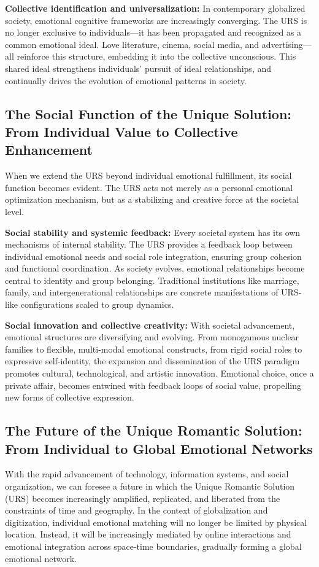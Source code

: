 \documentclass[12pt]{article}
\begin{document}
\textbf{Collective identification and universalization:} In contemporary globalized society, emotional cognitive frameworks are increasingly converging. The URS is no longer exclusive to individuals—it has been propagated and recognized as a common emotional ideal. Love literature, cinema, social media, and advertising—all reinforce this structure, embedding it into the collective unconscious. This shared ideal strengthens individuals’ pursuit of ideal relationships, and continually drives the evolution of emotional patterns in society.
\subsection{The Social Function of the Unique Solution: From Individual Value to Collective Enhancement}

When we extend the URS beyond individual emotional fulfillment, its social function becomes evident. The URS acts not merely as a personal emotional optimization mechanism, but as a stabilizing and creative force at the societal level.

\textbf{Social stability and systemic feedback:} Every societal system has its own mechanisms of internal stability. The URS provides a feedback loop between individual emotional needs and social role integration, ensuring group cohesion and functional coordination. As society evolves, emotional relationships become central to identity and group belonging. Traditional institutions like marriage, family, and intergenerational relationships are concrete manifestations of URS-like configurations scaled to group dynamics.

\textbf{Social innovation and collective creativity:} With societal advancement, emotional structures are diversifying and evolving. From monogamous nuclear families to flexible, multi-modal emotional constructs, from rigid social roles to expressive self-identity, the expansion and dissemination of the URS paradigm promotes cultural, technological, and artistic innovation. Emotional choice, once a private affair, becomes entwined with feedback loops of social value, propelling new forms of collective expression.

\subsection{The Future of the Unique Romantic Solution: From Individual to Global Emotional Networks}

With the rapid advancement of technology, information systems, and social organization, we can foresee a future in which the Unique Romantic Solution (URS) becomes increasingly amplified, replicated, and liberated from the constraints of time and geography. In the context of globalization and digitization, individual emotional matching will no longer be limited by physical location. Instead, it will be increasingly mediated by online interactions and emotional integration across space-time boundaries, gradually forming a global emotional network.
\end{document}
